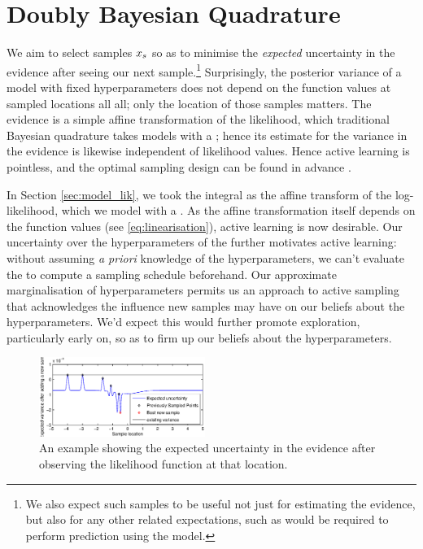 \documentclass{article}
\begin{document}
\section{Doubly Bayesian Quadrature}

We aim to select samples $\lfv_s$ so as to minimise the \textit{expected} uncertainty in the evidence after seeing our next sample.\footnote{We also expect such samples to be useful not just for estimating the evidence, but also for any other related expectations, such as would be required to perform prediction using the model.}
Surprisingly, the posterior variance of a \gpb model with fixed hyperparameters does not depend on the function values at sampled locations all all; only the location of those samples matters. The evidence is a simple affine transformation of the likelihood, which traditional Bayesian quadrature takes models with a \gp; hence its estimate for the variance in the evidence is likewise independent of likelihood values. Hence active learning is pointless, and the optimal sampling design can be found in advance \cite{minka2000dqr}.

In Section \ref{sec:model_lik}, we took the integral as the affine transform of the log-likelihood, which we model with a \gpb. As the affine transformation itself depends on the function values (see \eqref{eq:linearisation}), active learning is now desirable. Our uncertainty over the hyperparameters of the \gpb further motivates active learning: without assuming \textit{a priori} knowledge of the hyperparameters, we can't evaluate the \gpb to compute a sampling schedule beforehand. Our approximate marginalisation of hyperparameters permits us an approach to active sampling that acknowledges the influence new samples may have on our beliefs about the hyperparameters. We'd expect this would further promote exploration, particularly early on, so as to firm up our beliefs about the hyperparameters. 

 \begin{figure}
 \centering
 \includegraphics[width=0.48\textwidth]{figures/eue.eps}
 \caption{An example showing the expected uncertainty in the evidence after observing the likelihood function at that location.}
 \label{fig:eue}
 \end{figure}
 
\end{document}
